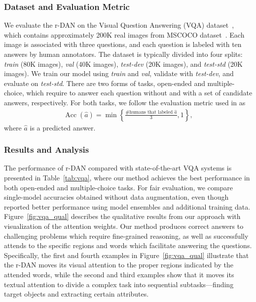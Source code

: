 \documentclass[10pt,twocolumn,letterpaper]{article}
\begin{document}
\subsubsection{Dataset and Evaluation Metric}
We evaluate the r-DAN on the Visual Question Answering (VQA) dataset~\cite{antol2015vqa}, which contains approximately 200K real images from MSCOCO dataset~\cite{lin2014microsoft}.
Each image is associated with three questions, and each question is labeled with ten answers by human annotators.
The dataset is typically divided into four splits: \emph{train} (80K images), \emph{val} (40K images), \emph{test-dev} (20K images), and \emph{test-std} (20K images).
We train our model using \emph{train} and \emph{val}, validate with \emph{test-dev}, and evaluate on \emph{test-std}.
There are two forms of tasks, open-ended and multiple-choice, which require to answer each question without and with a set of candidate answers, respectively.
For both tasks, we follow the evaluation metric used in \cite{antol2015vqa} as
\begin{align}
	\operatorname{Acc}(\hat{a}) = \min \left\{ \frac{\text{\#humans that labeled }\hat{a}}{3}, 1 \right\},
\label{eq:acc}
\end{align}
where $\hat{a}$ is a predicted answer.

\subsubsection{Results and Analysis}
The performance of r-DAN compared with state-of-the-art VQA systems is presented in Table~\ref{tab:vqa}, where our method achieves the best performance in both open-ended and multiple-choice tasks.
For fair evaluation, we compare single-model accuracies obtained without data augmentation, even though \cite{fukui2016multimodal} reported better performance using model ensembles and additional training data.
Figure~\ref{fig:vqa_qual} describes the qualitative results from our approach with visualization of the attention weights.
Our method produces correct answers to challenging problems which require fine-grained reasoning, as well as successfully attends to the specific regions and words which facilitate answering the questions.
Specifically, the first and fourth examples in Figure~\ref{fig:vqa_qual} illustrate that the r-DAN moves its visual attention to the proper regions indicated by the attended words, while the second and third examples show that it moves its textual attention to divide a complex task into sequential subtasks---finding target objects and extracting certain attributes.
\end{document}
